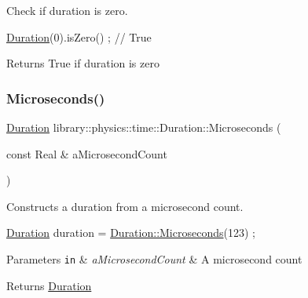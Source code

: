 Check if duration is zero. 


\begin{DoxyCode}
\hyperlink{classlibrary_1_1physics_1_1time_1_1_duration_a0a70efcf487a841da572afcf00001f64}{Duration}(0).isZero() ; \textcolor{comment}{// True}
\end{DoxyCode}


\begin{DoxyReturn}{Returns}
True if duration is zero 
\end{DoxyReturn}
\mbox{\label{classlibrary_1_1physics_1_1time_1_1_duration_a9082d43579a99fd667b0080de8adf8ed}} 
\subsubsection{\texorpdfstring{Microseconds()}{Microseconds()}}
{\footnotesize\ttfamily \hyperlink{classlibrary_1_1physics_1_1time_1_1_duration}{Duration} library\+::physics\+::time\+::\+Duration\+::\+Microseconds (\begin{DoxyParamCaption}\item[{const Real \&}]{a\+Microsecond\+Count }\end{DoxyParamCaption})\hspace{0.3cm}{\ttfamily [static]}}



Constructs a duration from a microsecond count. 


\begin{DoxyCode}
\hyperlink{classlibrary_1_1physics_1_1time_1_1_duration_a0a70efcf487a841da572afcf00001f64}{Duration} duration = \hyperlink{classlibrary_1_1physics_1_1time_1_1_duration_a9082d43579a99fd667b0080de8adf8ed}{Duration::Microseconds}(123) ;
\end{DoxyCode}



\begin{DoxyParams}[1]{Parameters}
\mbox{\tt in}  & {\em a\+Microsecond\+Count} & A microsecond count \\
\hline
\end{DoxyParams}
\begin{DoxyReturn}{Returns}
\hyperlink{classlibrary_1_1physics_1_1time_1_1_duration}{Duration} 
\end{DoxyReturn}
\mbox{\label{classlibrary_1_1physics_1_1time_1_1_duration_ab6eab798898a96019a8c944cd565e161}} 
